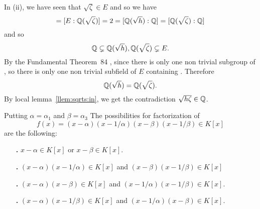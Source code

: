 \begin{myenumerate}
\begin{itemize}
   In (ii), we have seen that \(\sqrt{\zeta} \in E\) and so
   we have
   \begin{equation*}
        [E:\Q(\sqrt{h})] = [E:\Q(\sqrt{\zeta})] = 
        2 =
        [\Q(\sqrt{h}):\Q] = [\Q(\sqrt{\zeta}):\Q]
   \end{equation*}
   and so
   \begin{equation*}
    \mathbb{Q} \subsetneq \mathbb{Q}(\sqrt{h}), \mathbb{Q}(\sqrt{\zeta}) \subsetneq E.
   \end{equation*}
   By the Fundamental Theorem~84 \cite{Rotman98}, since there is only
   one non trivial subgroup of , so there is only one non trivial 
   subfield of $E$ containing \Q. Therefore 
   \begin{equation*}
      \mathbb{Q}(\sqrt{h}) = \mathbb{Q}(\sqrt{\zeta}).
   \end{equation*}
   By local lemma~\ref{llem:sqrts:in}, we get the contradiction
   \(\sqrt{h\zeta} \in \mathbb{Q}\).



 \iffalse
   Putting \(\alpha=\alpha_1\) and \(\beta=\alpha_3\)
   The possibilities for factorization of 
   \begin{equation*}
   f(x) = (x-\alpha)(x-1/\alpha)(x-\beta)(x-1/\beta) \in K[x]
   \end{equation*}
   are the following:
   \newcommand{\FcLab}[1]{\fbox{\textbf{\ensuremath{\bm{#1}}}}}
   \newcommand{\FcLabp}[1]{\FcLab{#1}\textbf{.}}
   \begin{itemize}

    \item[\FcLabp{\alpha}]
      \(x-\alpha\in K[x]\) or \(x-\beta\in K[x]\).

    \item[\FcLabp{\alpha+}]
      \((x-\alpha)(x-1/\alpha)\in K[x]\) and
      \((x-\beta)(x-1/\beta)\in K[x]\)

    \item[\FcLabp{\alpha\beta}]
      \((x-\alpha)(x-\beta)\in K[x]\) and
      \((x-1/\alpha)(x-1/\beta)\in K[x]\).

    \item [\FcLabp{\alpha/\beta}]
      \((x-\alpha)(x-1/\beta)\in K[x]\) and
      \((x-1/\alpha)(x-\beta)\in K[x]\).


\end{itemize}
\end{itemize}
\end{myenumerate}
